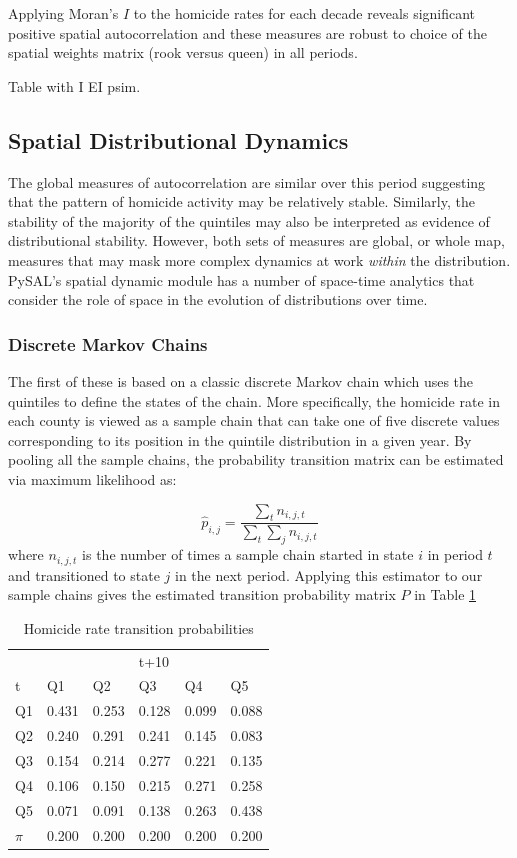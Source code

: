 \documentclass[11pt, titlepage]{article}
\begin{document}
Applying Moran's $I$ to the homicide rates for each decade reveals
significant positive spatial autocorrelation and these measures are
robust to choice of the spatial weights matrix (rook versus queen) in
all periods.

Table with I EI psim.

\subsection{Spatial Distributional Dynamics}

The global measures of autocorrelation are similar over this period
suggesting that the pattern of homicide activity may be relatively
stable. Similarly, the stability of the majority of the quintiles may
also be interpreted as evidence of distributional stability. However,
both sets of measures are global, or whole map, measures that may mask
more complex dynamics at work \emph{within} the distribution. PySAL's
spatial dynamic module has a number of space-time analytics that
consider the role of space in the evolution of distributions over time.

\subsubsection{Discrete Markov Chains}

The first of these is based on a classic discrete Markov chain which
uses the quintiles to define the states of the chain. More specifically,
the homicide rate in each county is viewed as a sample chain that can
take one of five discrete values corresponding to its position in the
quintile distribution in a given year. By pooling all the sample chains,
the probability transition matrix can be estimated via maximum
likelihood as:

\begin{equation}
\hat{p}_{i,j} = \frac{\sum_t n_{i,j,t}}{\sum_t \sum_j n_{i,j,t}} 
\label{e:cm}
\end{equation}
where $n_{i,j,t}$ is the number of times a sample chain started in state $i$
in period $t$ and transitioned to state $j$ in the next period. Applying this estimator
to our sample chains gives the  estimated transition
probability matrix $P$ in Table \ref{t:cm}

\begin{table}
  \centering
  \small
\begin{tabular}{|l|lllll|}\hline
   &  &  &t+10& & \\
  t&Q1&Q2&Q3&Q4&Q5\\
  \hline
   Q1& 0.431&0.253&0.128&0.099&0.088\\
   Q2& 0.240&0.291&0.241&0.145&0.083\\
   Q3& 0.154&0.214&0.277&0.221&0.135\\
   Q4& 0.106&0.150&0.215&0.271&0.258\\
   Q5& 0.071&0.091&0.138&0.263&0.438\\
    \hline
    $\pi$&0.200&0.200&0.200&0.200&0.200\\
    \hline
\end{tabular}
\caption{Homicide rate transition probabilities}
\label{t:cm}
\end{table}
\end{document}
